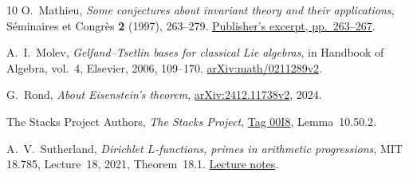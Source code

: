 \documentclass[11pt]{article}
\numberwithin{equation}{section}
\theoremstyle{definition}
\theoremstyle{remark}
\begin{document}
\begin{thebibliography}{10}
O.~Mathieu, \emph{Some conjectures about invariant theory and their
applications}, S\'eminaires et Congr\`es \textbf{2} (1997), 263--279.
\href{https://smf.emath.fr/sites/default/files/2026-04/smf_sem-cong_2_263-279__sample.pdf}{Publisher's excerpt, pp.~263--267}.

A.~I.~Molev, \emph{Gelfand--Tsetlin bases for classical Lie algebras},
in Handbook of Algebra, vol.~4, Elsevier, 2006, 109--170.
\href{https://arxiv.org/abs/math/0211289v2}{arXiv:math/0211289v2}.

G.~Rond, \emph{About Eisenstein's theorem},
\href{https://arxiv.org/abs/2412.11738v2}{arXiv:2412.11738v2}, 2024.

The Stacks Project Authors, \emph{The Stacks Project},
\href{https://stacks.math.columbia.edu/tag/00I8}{Tag 00I8},
Lemma~10.50.2.

A.~V.~Sutherland, \emph{Dirichlet $L$-functions, primes in arithmetic
progressions}, MIT 18.785, Lecture~18, 2021, Theorem~18.1.
\href{https://ocw.mit.edu/courses/18-785-number-theory-i-fall-2021/mit18_785f21_lec18.pdf}{Lecture notes}.

\end{thebibliography}
\end{document}

